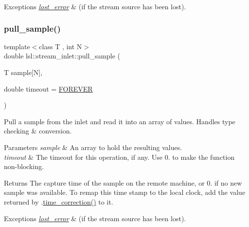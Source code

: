 \begin{DoxyExceptions}{Exceptions}
{\em \hyperlink{classlsl_1_1lost__error}{lost\+\_\+error}} & (if the stream source has been lost). \\
\hline
\end{DoxyExceptions}
\mbox{\label{classlsl_1_1stream__inlet_a58dc91be6ec0d1b83024a169ad0c292b}} 
\subsubsection{\texorpdfstring{pull\+\_\+sample()}{pull\_sample()}\hspace{0.1cm}{\footnotesize\ttfamily [1/15]}}
{\footnotesize\ttfamily template$<$class T , int N$>$ \\
double lsl\+::stream\+\_\+inlet\+::pull\+\_\+sample (\begin{DoxyParamCaption}\item[{T}]{sample\mbox{[}\+N\mbox{]},  }\item[{double}]{timeout = {\ttfamily \hyperlink{namespacelsl_a74cfbc9077aca21295117217249721ed}{F\+O\+R\+E\+V\+ER}} }\end{DoxyParamCaption})\hspace{0.3cm}{\ttfamily [inline]}}

Pull a sample from the inlet and read it into an array of values. Handles type checking \& conversion. 
\begin{DoxyParams}{Parameters}
{\em sample} & An array to hold the resulting values. \\
\hline
{\em timeout} & The timeout for this operation, if any. Use 0. to make the function non-\/blocking. \\
\hline
\end{DoxyParams}
\begin{DoxyReturn}{Returns}
The capture time of the sample on the remote machine, or 0. if no new sample was available. To remap this time stamp to the local clock, add the value returned by .\hyperlink{classlsl_1_1stream__inlet_a845d95f5fc60fb9cd01fb73d3da75e94}{time\+\_\+correction()} to it. 
\end{DoxyReturn}

\begin{DoxyExceptions}{Exceptions}
{\em \hyperlink{classlsl_1_1lost__error}{lost\+\_\+error}} & (if the stream source has been lost). \\
\hline
\end{DoxyExceptions}
\mbox{\label{classlsl_1_1stream__inlet_af3707fbfd5e9f54be73f9d55de55a8fc}} 
